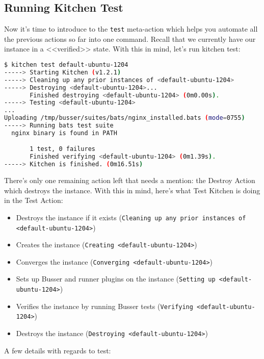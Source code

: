 \subsection{Running Kitchen Test}

Now it's time to introduce to the \lstinline!test! meta-action which helps you automate all the previous actions so far into one command. Recall that we currently have our instance in a <<verified>> state. With this in mind, let's run kitchen test:

\begin{lstlisting}[language=Bash,label=lst:testing-test-kitchen18]
$ kitchen test default-ubuntu-1204
-----> Starting Kitchen (v1.2.1)
-----> Cleaning up any prior instances of <default-ubuntu-1204>
-----> Destroying <default-ubuntu-1204>...
       Finished destroying <default-ubuntu-1204> (0m0.00s).
-----> Testing <default-ubuntu-1204>
...
Uploading /tmp/busser/suites/bats/nginx_installed.bats (mode=0755)
-----> Running bats test suite
  nginx binary is found in PATH

       1 test, 0 failures
       Finished verifying <default-ubuntu-1204> (0m1.39s).
-----> Kitchen is finished. (0m16.51s)
\end{lstlisting}

There's only one remaining action left that needs a mention: the Destroy Action which destroys the instance. With this in mind, here's what Test Kitchen is doing in the Test Action:

\begin{itemize}
  \item Destroys the instance if it exists (\lstinline!Cleaning up any prior instances of <default-ubuntu-1204>!)
  \item Creates the instance (\lstinline!Creating <default-ubuntu-1204>!)
  \item Converges the instance (\lstinline!Converging <default-ubuntu-1204>!)
  \item Sets up Busser and runner plugins on the instance (\lstinline!Setting up <default-ubuntu-1204>!)
  \item Verifies the instance by running Busser tests (\lstinline!Verifying <default-ubuntu-1204>!)
  \item Destroys the instance (\lstinline!Destroying <default-ubuntu-1204>!)
\end{itemize}

A few details with regards to test:

